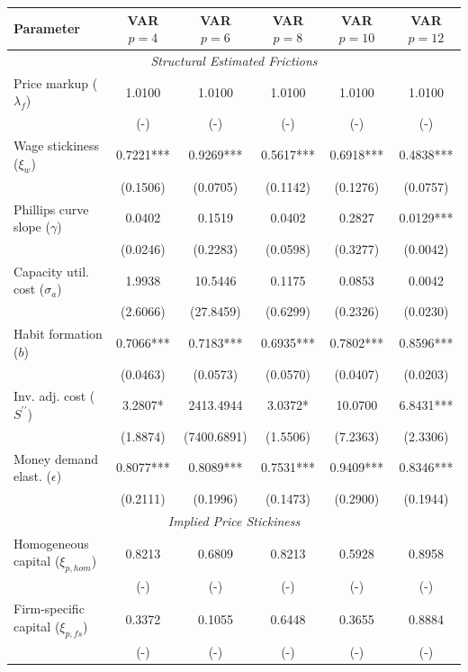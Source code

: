 \begin{table}[htpb]
    \centering
    \scriptsize
    \begin{tabular}{lccccc}
    \toprule
    \textbf{Parameter} & \textbf{VAR $p=4$} & \textbf{VAR $p=6$} & \textbf{VAR $p=8$} & \textbf{VAR $p=10$} & \textbf{VAR $p=12$} \\
    \midrule \multicolumn{6}{c}{\textit{Structural Estimated Frictions}} \\
    Price markup ($\lambda_f$) & 1.0100 & 1.0100 & 1.0100 & 1.0100 & 1.0100 \\
    & (-) & (-) & (-) & (-) & (-) \\
    Wage stickiness ($\xi_w$) & 0.7221*** & 0.9269*** & 0.5617*** & 0.6918*** & 0.4838*** \\
    & (0.1506) & (0.0705) & (0.1142) & (0.1276) & (0.0757) \\
    Phillips curve slope ($\gamma$) & 0.0402 & 0.1519 & 0.0402 & 0.2827 & 0.0129*** \\
    & (0.0246) & (0.2283) & (0.0598) & (0.3277) & (0.0042) \\
    Capacity util. cost ($\sigma_a$) & 1.9938 & 10.5446 & 0.1175 & 0.0853 & 0.0042 \\
    & (2.6066) & (27.8459) & (0.6299) & (0.2326) & (0.0230) \\
    Habit formation ($b$) & 0.7066*** & 0.7183*** & 0.6935*** & 0.7802*** & 0.8596*** \\
    & (0.0463) & (0.0573) & (0.0570) & (0.0407) & (0.0203) \\
    Inv. adj. cost ($S^{\prime\prime}$) & 3.2807* & 2413.4944 & 3.0372* & 10.0700 & 6.8431*** \\
    & (1.8874) & (7400.6891) & (1.5506) & (7.2363) & (2.3306) \\
    Money demand elast. ($\epsilon$) & 0.8077*** & 0.8089*** & 0.7531*** & 0.9409*** & 0.8346*** \\
    & (0.2111) & (0.1996) & (0.1473) & (0.2900) & (0.1944) \\
    \midrule \multicolumn{6}{c}{\textit{Implied Price Stickiness}} \\
    Homogeneous capital ($\xi_{p, hom}$) & 0.8213 & 0.6809 & 0.8213 & 0.5928 & 0.8958 \\
    & (-) & (-) & (-) & (-) & (-) \\
    Firm-specific capital ($\xi_{p, fs}$) & 0.3372 & 0.1055 & 0.6448 & 0.3655 & 0.8884 \\
    & (-) & (-) & (-) & (-) & (-) \\
    \bottomrule
    \end{tabular}
\end{table}
